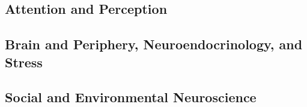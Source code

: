 \subsection*{Attention and Perception}

% 
% 
% 
% 
% 
% 
% 
% 
% 
% 
% 

\subsection*{Brain and Periphery, Neuroendocrinology, and Stress}

% 
% 
% 
% 
% 
% 
% 
% 
% 
% 
% 
% 
% 
% 
% 
% 
% 
% 

\subsection*{Social and Environmental Neuroscience}

% 
% 
% 
% 
% 
% 
% 
% 
% 
% 
% 
% 
% 
% 
% 
\newpage

